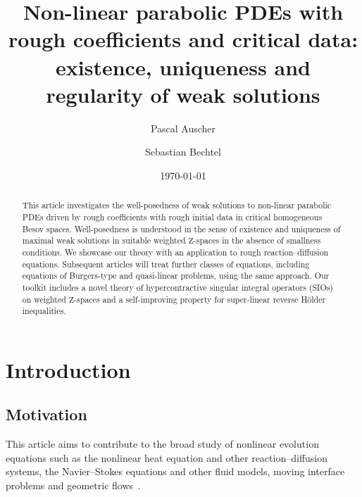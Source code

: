 \documentclass[11pt, leqno]{amsart}
\title[Non-linear parabolic PDEs with rough coefficients and critical data]{Non-linear parabolic PDEs with rough coefficients and critical data: existence, uniqueness and regularity of weak solutions}
\author{Pascal Auscher}
\author{Sebastian Bechtel}
\date{\today}
\theoremstyle{definition}
\newcommand{\Z}{\mathrm{Z}}
\begin{document}
	\begin{abstract}
		This article investigates the well-posedness of weak solutions to non-linear parabolic PDEs driven by rough coefficients with rough initial data in critical homogeneous Besov spaces. Well-posedness is understood in the sense of existence and uniqueness of maximal weak solutions in suitable weighted $\Z$-spaces in the absence of smallness conditions. We showcase our theory with an application to rough reaction--diffusion equations. Subsequent articles will treat further classes of equations, including equations of Burgers-type and quasi-linear problems, using the same approach. Our toolkit includes a novel theory of hypercontractive singular integral operators (SIOs) on weighted $\mathrm{Z}$-spaces and a self-improving property for super-linear reverse Hölder inequalities.
	\end{abstract}
	\maketitle

	\allowdisplaybreaks

	\setcounter{tocdepth}{1}
	\tableofcontents


	\section{Introduction}
	\label{sec:intro}

	\subsection{Motivation}
	\label{subsec:intro_motivation}

	This article aims to contribute to the broad study of nonlinear evolution equations such as the nonlinear heat equation and other reaction--diffusion systems, the Navier--Stokes equations and other fluid models, moving interface problems and geometric flows~\cite{Amann,Fujita,AW,KatoNS,KT,Ericksen_Leslie,Matioc,Fitzhugh,Nagumo,Koch-Lamm,DaPG}.
\end{document}
